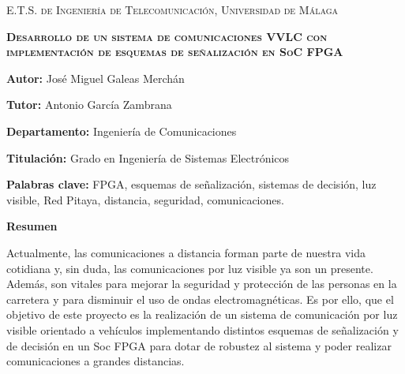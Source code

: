 
\pagestyle{fancy}
\renewcommand{\headrulewidth}{0pt}

\begin{center}
	\scshape
	E.T.S. de Ingeniería de Telecomunicación, Universidad de Málaga
\end{center}

\bigskip

\begin{center}
	\scshape
	\textbf{Desarrollo de un sistema de comunicaciones VVLC con implementación de esquemas de 
	señalización en SoC FPGA}
\end{center}

\bigskip \bigskip \bigskip

\begin{minipage}{\textwidth}

\textbf{Autor:}  José Miguel Galeas Merchán

\medskip

\textbf{Tutor:} Antonio García Zambrana



\medskip

\textbf{Departamento:} Ingeniería de Comunicaciones

\medskip

\textbf{Titulación:} Grado en Ingeniería de Sistemas Electrónicos

\medskip

\textbf{Palabras clave:} FPGA, esquemas de señalización, sistemas de decisión, 
luz visible, Red Pitaya, distancia, seguridad, comunicaciones.

\bigskip \bigskip


\end{minipage}

\begin{center}
	\textbf{Resumen}
\end{center}

Actualmente, las comunicaciones a distancia forman parte de nuestra vida cotidiana y, sin 
duda, las comunicaciones por luz visible ya son un presente. Además, son vitales para 
mejorar la seguridad y protección de las personas en la carretera y para disminuir el uso 
de ondas electromagnéticas. Es por ello, que el objetivo
de este proyecto es la realización de un sistema de comunicación por luz visible 
orientado a vehículos
implementando distintos esquemas de señalización y de decisión en un Soc FPGA para dotar de 
robustez al sistema y poder realizar comunicaciones a grandes distancias.

